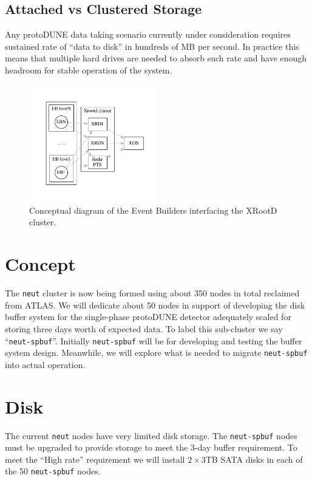 \documentclass[pdftex,12pt,letter]{article}
\newcommand{\pd}{protoDUNE\xspace}
\begin{document}
\subsection{Attached vs Clustered Storage}
Any \pd data taking scenario currently under consideration requires sustained rate
of ``data to disk'' in hundreds of MB per second. In practice this means that
multiple hard drives are needed to absorb such rate and have enough headroom
for stable operation of the system.

\begin{figure}[tbh]
  \centering
  \includegraphics[width=0.5\textwidth]{figures/doob-join.pdf}
  \caption{Conceptual diagram of the Event Builders interfacing the XRootD cluster.}
  \label{fig:doob-join}
\end{figure}

\section{Concept}

The \texttt{neut} cluster is now being formed using about 350 nodes in
total reclaimed from ATLAS.  We will dedicate about 50 nodes in
support of developing the disk buffer system for the single-phase
protoDUNE detector adequately scaled for storing three days worth of
expected data.  To label this sub-cluster we say
``\texttt{neut-spbuf}''.  Initially \texttt{neut-spbuf} will be for
developing and testing the buffer system design.  Meanwhile, we will
explore what is needed to migrate \texttt{neut-spbuf} into actual
operation.

\section{Disk}

The current \texttt{neut} nodes have very limited disk storage.  The
\texttt{neut-spbuf} nodes must be upgraded to provide storage to meet
the 3-day buffer requirement. To meet the ``High rate'' requirement we
will install $2\times 3$TB SATA disks in each of the 50
\texttt{neut-spbuf} nodes.
\end{document}
